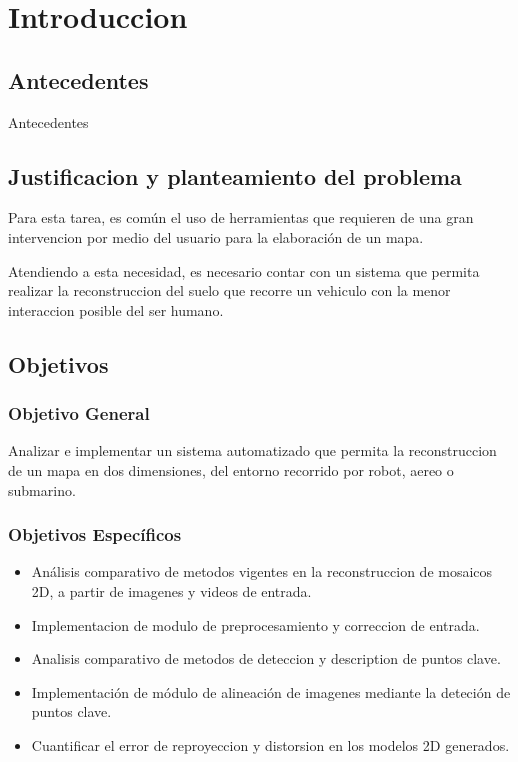 
\chapter{Introduccion}
\label{capitulo1}
\section{Antecedentes}

Antecedentes

\section{Justificacion y planteamiento del problema}


Para esta tarea, es común el uso de herramientas que requieren de una gran intervencion por medio del usuario para la elaboración de un mapa.
    
Atendiendo a esta necesidad, es necesario contar con un sistema que permita realizar la reconstruccion del suelo que recorre un vehiculo con la menor interaccion posible del ser humano.


\section{Objetivos}

\subsection{Objetivo General}

Analizar e implementar un sistema automatizado que permita la reconstruccion de un mapa en dos dimensiones, del entorno recorrido por robot, aereo o submarino.

\subsection{Objetivos Específicos}

\begin{itemize}
	\item Análisis comparativo de metodos vigentes en la reconstruccion de mosaicos 2D, a partir de imagenes y videos de entrada.
	\item Implementacion de modulo de preprocesamiento y correccion de entrada.
	\item Analisis comparativo de metodos de deteccion y description de puntos clave.
	\item Implementación de módulo de alineación de imagenes mediante la deteción de puntos clave.
	\item Cuantificar el error de reproyeccion y distorsion en los modelos 2D generados.
\end{itemize}

